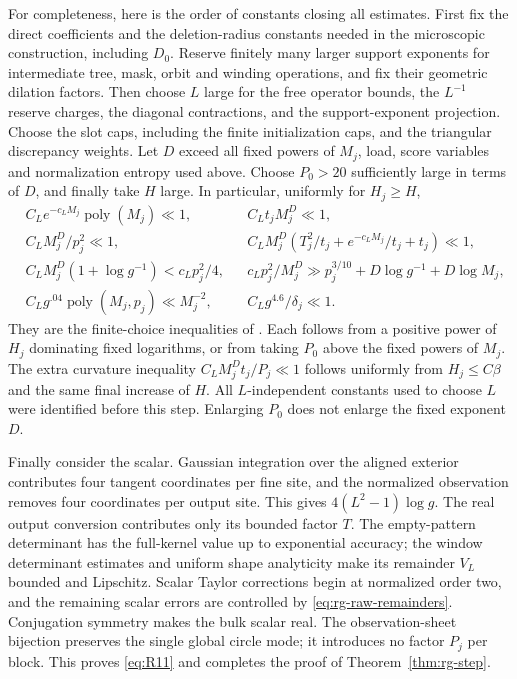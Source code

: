 For completeness, here is the order of constants closing all estimates.
First fix the direct coefficients and the deletion-radius constants
needed in the microscopic construction, including $D_0$.  Reserve
finitely many larger support exponents for intermediate tree, mask,
orbit and winding operations, and fix their geometric dilation factors.
Then choose $L$ large for the free operator bounds, the $L^{-1}$ reserve
charges, the diagonal contractions, and the support-exponent projection.
Choose the slot caps, including the finite initialization caps, and the
triangular discrepancy weights.  Let $D$ exceed all fixed powers of
$M_j$, load, score variables and normalization entropy used above.
Choose $P_0>20$ sufficiently large in terms of $D$, and finally take $H$
large.  In particular, uniformly for $H_j\ge H$,
\begin{align}
 &C_Le^{-c_LM_j}\operatorname{poly}(M_j)\ll1,
 &&C_Lt_jM_j^D\ll1,\nonumber\\
 &C_LM_j^D/p_j^2\ll1,
 &&C_LM_j^D(T_j^2/t_j+e^{-c_LM_j}/t_j+t_j)\ll1,
 \nonumber\\
 &C_LM_j^D(1+\log g^{-1})<c_Lp_j^2/4,
 &&c_Lp_j^2/M_j^D\gg p_j^{3/10}+D\log g^{-1}+D\log M_j,
 \nonumber\\
 &C_Lg^{.04}\operatorname{poly}(M_j,p_j)\ll M_j^{-2},
 &&C_Lg^{4.6}/\delta_j\ll1.
 \label{eq:rg-finite-choices}
\end{align}
They are the finite-choice inequalities of
\cite[Section ``Normalization, periods, and closure'']{SharpO4}.
Each follows from a positive power of $H_j$ dominating fixed logarithms,
or from taking $P_0$ above the fixed powers of $M_j$.  The extra
curvature inequality $C_LM_j^Dt_j/P_j\ll1$ follows uniformly from
$H_j\le C\beta$ and the same final increase of $H$.  All $L$-independent
constants used to choose $L$ were identified before this step.  Enlarging
$P_0$ does not enlarge the fixed exponent $D$.

Finally consider the scalar.  Gaussian integration over the aligned
exterior contributes four tangent coordinates per fine site, and the
normalized observation removes four coordinates per output site.  This
gives $4(L^2-1)\log g$.  The real output conversion contributes only its
bounded factor $T$.  The empty-pattern determinant has the full-kernel
value up to exponential accuracy; the window determinant estimates and
uniform shape analyticity make its remainder $V_L$ bounded and
Lipschitz.  Scalar Taylor corrections begin at normalized order two,
and the remaining scalar errors are controlled by
\eqref{eq:rg-raw-remainders}.  Conjugation symmetry makes the bulk scalar
real.  The observation-sheet bijection preserves the single global
circle mode; it introduces no factor $P_j$ per block.  This proves
\eqref{eq:R11} and completes the proof of Theorem~\ref{thm:rg-step}.
